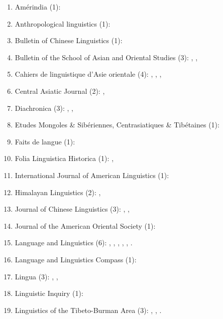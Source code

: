 \documentclass[oldfontcommands,oneside,a4paper,11pt]{article}
\begin{document}
 \begin{enumerate}
 \item Amérindia (1): \citet{jacques12bear}
 \item Anthropological linguistics (1): \citet{japhug14ideophones}
 \item Bulletin of Chinese Linguistics (1): \citet{jacques15derivational.khaling}
 \item Bulletin of the School of Asian and Oriental Studies (3):  \citet{jacques10refl}, \citet{rg-gj12yod}, \citet{jacques13yod}
 \item Cahiers de linguistique d'Asie orientale (4): \citet{jacques00ywij},  \citet{jacques03dissimilation},   \citet{jacques07chang},  \citet{michaud10bonin}
 \item Central Asiatic Journal (2):  \citet{jacques10imperial}, \citet{jacques14ergative}
  \item Diachronica (3): \citet{jacques.michaud11naish}, \citet{michaud-jacques12nasalite}, \citet{jacques15comparative}
  \item Etudes Mongoles \& Sibériennes, Centrasiatiques \& Tibétaines (1):  \citet{jacques09e}
  \item Faits de langue (1): \citet{jacques07redupl}
 \item Folia Linguistica Historica (1): \citet{jacques13arapaho}, \citet{jacques15causative}
 \item International Journal of American Linguistics (1): \citet{jacques16ebde}
 \item Himalayan Linguistics (2): \citet{jacques10zos},  \citet{jacques14rtau}
 \item Journal of Chinese Linguistics (3):   \citet{jacques11tangut.verb}, \citet{jacques15sr}, \citet{jacques16relatives}
 \item Journal of the American Oriental Society (1): \citet{jacques11ngwemi}
   \item Language and Linguistics (6):  \citet{jacques07passif}, \citet{jacques09tangutverb}, \citet{jacques10inverse},     \citet{jacques11pumi.tone}, \citet{jacques12agreement},    \citet{jacques12khaling}.  
   \item  Language and Linguistics Compass (1): \citet{jacques14inverse}   
 \item Lingua (3):  \citet{jacques11lingua}, \citet{jacques12incorp}, \citet{jacques14antipassive}
 \item Linguistic Inquiry (1): \citet{antonov14need}
 \item Linguistics of the Tibeto-Burman Area (3): \citet{jacques09wazur}, \citet{jacques13tropative}, \citet{jacques14linking}.

\end{enumerate}
\end{document}
